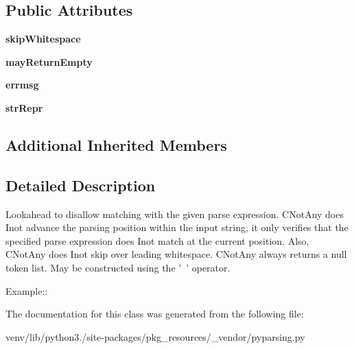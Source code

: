 \subsection*{Public Attributes}
\begin{DoxyCompactItemize}
\item 
\mbox{\label{classpkg__resources_1_1__vendor_1_1pyparsing_1_1_not_any_a2d784a8cff65a02f83e5a09260be4e4a}} 
{\bfseries skip\+Whitespace}
\item 
\mbox{\label{classpkg__resources_1_1__vendor_1_1pyparsing_1_1_not_any_ac4911132cd1f8d5ef6f2d1ea9fea3ceb}} 
{\bfseries may\+Return\+Empty}
\item 
\mbox{\label{classpkg__resources_1_1__vendor_1_1pyparsing_1_1_not_any_a2eb4d57decb5dcc9aa829e6474c4f922}} 
{\bfseries errmsg}
\item 
\mbox{\label{classpkg__resources_1_1__vendor_1_1pyparsing_1_1_not_any_abd001e6feccd91326d61da128ec4ccb5}} 
{\bfseries str\+Repr}
\end{DoxyCompactItemize}
\subsection*{Additional Inherited Members}


\subsection{Detailed Description}
\begin{DoxyVerb}Lookahead to disallow matching with the given parse expression.  C{NotAny}
does I{not} advance the parsing position within the input string, it only
verifies that the specified parse expression does I{not} match at the current
position.  Also, C{NotAny} does I{not} skip over leading whitespace. C{NotAny}
always returns a null token list.  May be constructed using the '~' operator.

Example::\end{DoxyVerb}
 

The documentation for this class was generated from the following file\+:\begin{DoxyCompactItemize}
\item 
venv/lib/python3./site-\/packages/pkg\+\_\+resources/\+\_\+vendor/pyparsing.\+py\end{DoxyCompactItemize}
